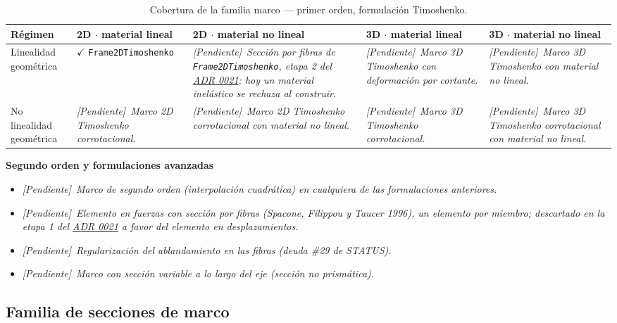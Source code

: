 \documentclass[11pt,oneside]{report}
\newcommand{\pendiente}[1]{\textcolor{pendienteorange}{\textit{[Pendiente]}~\textcolor{pendienteorange}{\textit{#1}}}}
\begin{document}
\begin{table}[h]
\centering
\caption{Cobertura de la familia marco --- primer orden, formulación Timoshenko.}
\begin{tabularx}{\textwidth}{YYYYY}
\hline
\textbf{Régimen} & \textbf{2D \ensuremath{\cdot} material lineal} & \textbf{2D \ensuremath{\cdot} material no lineal} & \textbf{3D \ensuremath{\cdot} material lineal} & \textbf{3D \ensuremath{\cdot} material no lineal} \\
\hline
Linealidad geométrica & \ensuremath{\checkmark} \texttt{Frame2DTimoshenko} & \pendiente{Sección por fibras de \texttt{Frame2DTimoshenko}, etapa 2 del \hyperref[adr:0021]{ADR 0021}; hoy un material inelástico se rechaza al construir.} & \pendiente{Marco 3D Timoshenko con deformación por cortante.} & \pendiente{Marco 3D Timoshenko con material no lineal.} \\
No linealidad geométrica & \pendiente{Marco 2D Timoshenko corrotacional.} & \pendiente{Marco 2D Timoshenko corrotacional con material no lineal.} & \pendiente{Marco 3D Timoshenko corrotacional.} & \pendiente{Marco 3D Timoshenko corrotacional con material no lineal.} \\
\hline
\end{tabularx}
\end{table}
\textbf{Segundo orden y formulaciones avanzadas}

\begin{itemize}
  \item \pendiente{Marco de segundo orden (interpolación cuadrática) en cualquiera de las formulaciones anteriores.}
  \item \pendiente{Elemento en fuerzas con sección por fibras (Spacone, Filippou y Taucer 1996), un elemento por miembro; descartado en la etapa 1 del \hyperref[adr:0021]{ADR 0021} a favor del elemento en desplazamientos.}
  \item \pendiente{Regularización del ablandamiento en las fibras (deuda \#29 de STATUS).}
  \item \pendiente{Marco con sección variable a lo largo del eje (sección no prismática).}
\end{itemize}

\subsection{Familia de secciones de marco}
\end{document}
